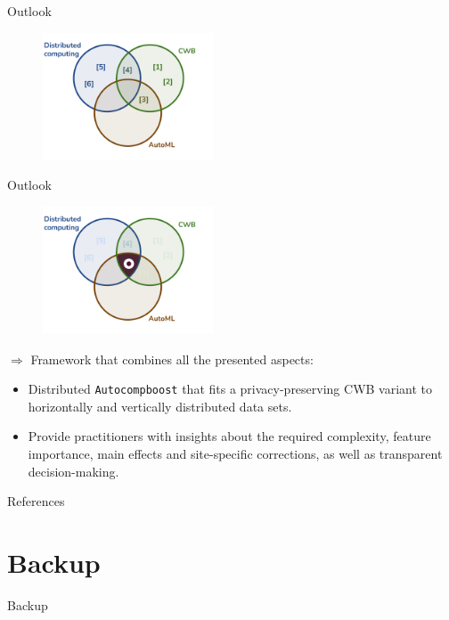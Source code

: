 \documentclass[t,10pt]{beamer}
\begin{document}
\begin{frame}{Outlook}
  \begin{figure}
    \centering
    \includegraphics[width=0.45\textwidth]{figures/topics.png}
  \end{figure}
\end{frame}

\begin{frame}{Outlook}
  \begin{figure}
    \centering
    \includegraphics[width=0.45\textwidth]{figures/topics-outlook.png}
  \end{figure}
  $\Rightarrow$ Framework that combines all the presented aspects:
    \begin{itemize}
      \item Distributed \texttt{Autocompboost} that fits a privacy-preserving CWB variant to horizontally and vertically distributed data sets.\vspace{0.1cm}
      \item Provide practitioners with insights about the required complexity, feature importance, main effects and site-specific corrections, as well as transparent decision-making.
    \end{itemize}
    \addtocounter{framenumber}{-1}
\end{frame}


\appendix

\begin{frame}[allowframebreaks]{References}
\nocite{*}
\scriptsize


\end{frame}

\section{Backup}

\begin{frame}{Backup}
\end{frame}
\end{document}
